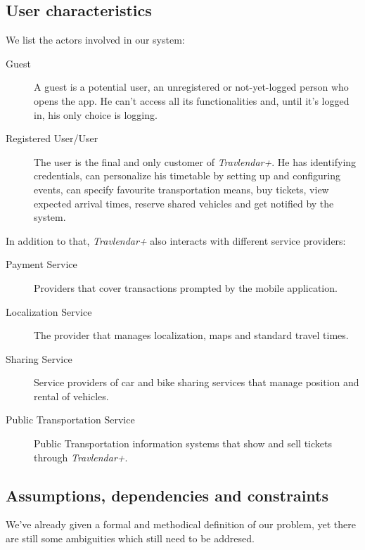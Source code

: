 			
	\subsection{User characteristics}
		We list the actors involved in our system:
		
			\begin{description}
				\item[Guest] A guest is a potential user, an unregistered or not-yet-logged person who opens the app. He can't access all its functionalities and, until it's logged in, his only choice is logging.
				
				\item[Registered User/User] The user is the final and only customer of \textit{Travlendar+}. He has identifying credentials, can personalize his timetable by setting up and configuring events, can specify favourite transportation means, buy tickets, view expected arrival times, reserve shared vehicles and get notified by the system.
			\end{description}
	
	In addition to that, \textit{Travlendar+} also interacts with different service providers:
	
			\begin{description}
				\item[Payment Service] Providers that cover transactions prompted by the mobile application.
				\item[Localization Service] The provider that manages localization, maps and standard travel times. 
				\item[Sharing Service] Service providers of car and bike sharing services that manage position and rental of vehicles.
				\item[Public Transportation Service] Public Transportation information systems that show and sell tickets through \textit{Travlendar+}.
		\end{description}

	\subsection{Assumptions, dependencies and constraints}

		We've already given a formal and methodical definition of our problem, yet there are still some ambiguities which still need to be addresed.
			
